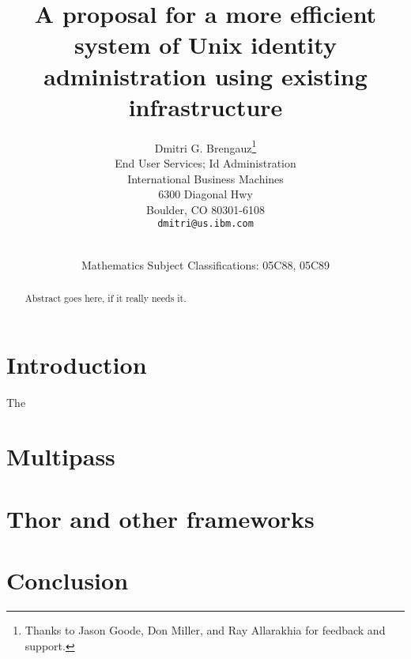 \documentclass[12pt]{article}
\title{A proposal for a more efficient system of Unix identity
  administration using existing infrastructure}
\author{Dmitri G. Brengauz\thanks{Thanks to Jason Goode, Don Miller,
    and Ray Allarakhia for feedback and support.}\\
\small End User Services; Id Administration\\
\small International Business Machines \\
\small 6300 Diagonal Hwy\\
\small Boulder, CO 80301-6108\\
\small \texttt{dmitri@us.ibm.com}\\
}
\date{\dateline{Jan 1, 2009}{Jan 2, 2009}{Jan 3, 2009}\\
\small Mathematics Subject Classifications: 05C88, 05C89}
\begin{document}
\maketitle

\begin{abstract}

Abstract goes here, if it really needs it.

\end{abstract}

\section{Introduction}

The 


\section{Multipass}



\section{Thor and other frameworks}


\section{Conclusion}
\end{document}
